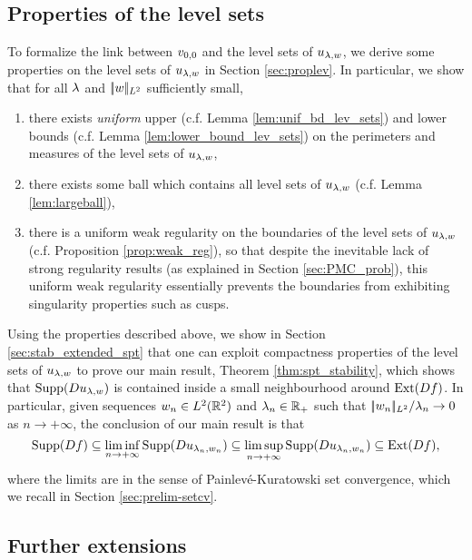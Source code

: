 \subsection{Properties of the level sets}
To formalize the link between $v_{0,0}$ and the level sets of $u_{\lambda,w}$, we  derive some properties on the level sets of $u_{\lambda,w}$ in Section \ref{sec:proplev}. In particular, we show that for all $\lambda$ and $|\!| w |\!|_{L^2}$ sufficiently small, 
\begin{enumerate}
\item there exists \emph{uniform} upper (c.f. Lemma \ref{lem:unif_bd_lev_sets}) and lower  bounds (c.f. Lemma \ref{lem:lower_bound_lev_sets}) on the perimeters and measures of the level sets of $u_{\lambda,w}$,
\item there exists some ball which contains all level sets of $u_{\lambda,w}$ (c.f. Lemma \ref{lem:largeball}),
\item there is a uniform weak regularity on the boundaries of the level sets of $u_{\lambda,w}$ (c.f. Proposition \ref{prop:weak_reg}), so that despite the inevitable lack of strong regularity results (as explained in Section \ref{sec:PMC_prob}), this uniform weak regularity essentially prevents the boundaries from exhibiting singularity properties such as cusps.
\end{enumerate}

Using the properties described above, we show in Section \ref{sec:stab_extended_spt} that one can exploit compactness properties of the level sets of $u_{\lambda,w}$ to prove our main result, Theorem \ref{thm:spt_stability}, which shows that $\operatorname{Supp}(D u_{\lambda,w})$ is contained inside a small neighbourhood around $\operatorname{Ext}(Df)$. In particular, given sequences $w_n\in L^2(\mathbb{R}^2)$ and $\lambda_n\in \mathbb{R}_+$ such that
${|\!| w_n |\!|_{L^2}}/{\lambda_n}\to 0$ as $n\to +\infty$, the conclusion of our main result is that
\begin{equation*}
  \operatorname{Supp}(Df)\subseteq \liminf_{n\to +\infty} \operatorname{Supp}(Du_{\lambda_n,w_n}) \subseteq \limsup_{n\to+\infty} \operatorname{Supp}(Du_{\lambda_n,w_n})\subseteq \operatorname{Ext}(Df),
\end{equation*}
where the limits are in the sense of Painlev\'e-Kuratowski set convergence, which we recall in Section \ref{sec:prelim-setcv}.

\subsection{Further extensions}

